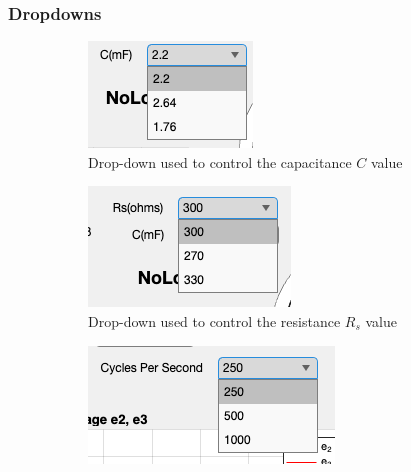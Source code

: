 \subsubsection{Dropdowns}
\begin{figure}[H]
     \centering
     \begin{subfigure}[b]{0.3\textwidth}
         \centering
    	 \includegraphics[width=\textwidth]{graphics/visualisation/ui_dropdowns_C}
     	\caption{Drop-down used to control the capacitance $C$ value}
     \end{subfigure}
     \hfill
     \begin{subfigure}[b]{0.3\textwidth}
         \centering
    	 \includegraphics[width=\textwidth]{graphics/visualisation/ui_dropdowns_Rs}
     	\caption{Drop-down used to control the resistance $R_s$ value}
     \end{subfigure}
     \hfill
     \begin{subfigure}[b]{0.3\textwidth}
         \centering
    	 \includegraphics[width=\textwidth]{graphics/visualisation/ui_dropdowns_cycles}

\end{subfigure}
\end{figure}
